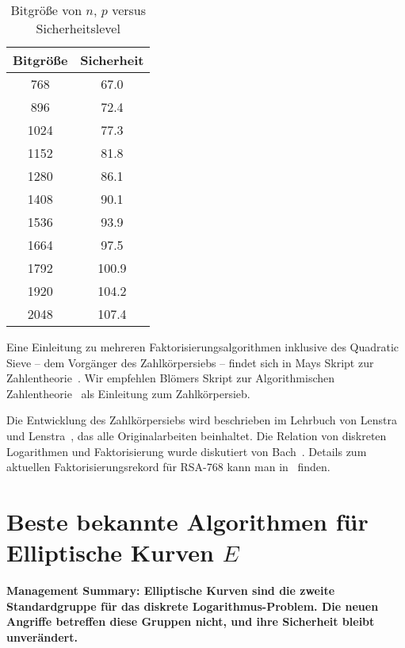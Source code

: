\begin{refsegment}
\begin{table}
\begin{center}
\begin{tabular}{c|c}
Bitgröße & Sicherheit\\
\hline
768 & 67.0\\
896 & 72.4\\
1024 & 77.3\\
1152 & 81.8\\
1280 & 86.1\\
1408 & 90.1\\
1536 & 93.9\\
1664 & 97.5\\
1792 & 100.9\\
1920 & 104.2\\
2048 & 107.4\\
\end{tabular}
\caption{Bitgröße von $n$, $p$ versus Sicherheitslevel}
\label{nfs-table}
\end{center}
\end{table}



Eine Einleitung zu mehreren Faktorisierungsalgorithmen inklusive des Quadratic Sieve -- dem Vorgänger des Zahlkörpersiebs -- findet sich in Mays Skript zur Zahlentheorie~\cite{May2013}. Wir empfehlen Bl\"omers Skript zur Algorithmischen Zahlentheorie~\cite{Bloemer1999} als Einleitung zum Zahlkörpersieb.

Die Entwicklung des Zahlkörpersiebs wird beschrieben im Lehrbuch von Lenstra und Lenstra~\cite{NFS1993}, das alle Originalarbeiten beinhaltet. Die Relation von diskreten Logarithmen und Faktorisierung wurde diskutiert von Bach~\cite{Bach1984}. Details zum aktuellen Faktorisierungsrekord für RSA-768 kann man in~\cite{factor768_2010} finden.



\newpage
\section{\texorpdfstring{Beste bekannte Algorithmen für Elliptische Kurven $E$}{Beste bekannte Algorithmen für Elliptische Kurven E}}

{\bf Management Summary: Elliptische Kurven sind die zweite Standardgruppe für das diskrete
Logarithmus-Problem. Die neuen Angriffe betreffen diese Gruppen nicht, und ihre Sicherheit bleibt unverändert.\\[0.1cm]}


\end{refsegment}
